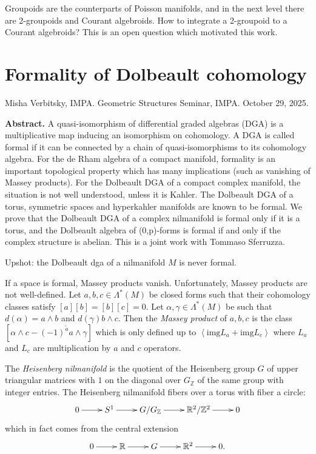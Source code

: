 Groupoids are the counterparts of Poisson
manifolds,
and in the next level there are 2-groupoids
and Courant algebroids.
How to integrate a 2-groupoid to a Courant
algebroids?
This is an open question which motivated this
work.



\section{Formality of Dolbeault cohomology}
\label{section-forma-dolbe-cohom}

\noindent
Misha Verbitsky, IMPA.
Geometric Structures Seminar, IMPA.
October 29, 2025.

\medskip\noindent
{\bf Abstract.}
A quasi-isomorphism of differential graded
algebras (DGA) is a multiplicative
map inducing an isomorphism on cohomology. A
DGA is called  formal if it can be
connected by a chain of  quasi-isomorphisms
to its cohomology algebra. For the
de Rham algebra of a compact manifold,
formality is an important  topological
property which has many implications (such as
vanishing of Massey products). For
the Dolbeault DGA of a compact complex
manifold, the situation is not well
understood, unless it is Kahler. The
Dolbeault DGA of a torus, symmetric spaces
and hyperkahler manifolds are known to be
formal.  We prove that the Dolbeault
DGA of a complex nilmanifold is formal only
if it is a torus, and the Dolbeault
algebra of (0,p)-forms is formal if and only
if the complex structure is
abelian. This is a joint work with Tommaso
Sferruzza.

\medskip\noindent
Upshot: the Dolbeault dga of a nilmanifold
$M$ is never formal.

\medskip\noindent
If a space is formal, Massey products vanish.
Unfortunately, Massey products are not
well-defined.
Let $a,b,c \in \Lambda^*(M)$ be closed forms
such that their cohomology classes satisfy
$[a][b]=[b][c]=0$.
Let  $\alpha,\gamma \in \Lambda^*(M)$
be such that $d(\alpha)=a \wedge b$ and
$d(\gamma)b \wedge c$.
Then the {\it Massey product} of $a,b,c$
is the class  $[\alpha \wedge
c-(-1)^{\tilde{a}}a \wedge \gamma]$
which is only defined up to
 $\left\langle{}\text{img}L_a + \text{img}
 L_c\right\rangle{}$
where $L_a$ and $L_c$ are multiplication by
$a$ and $c$ operators.

The {\it Heisenberg nilmanifold} is the
quotient of
the Heisenberg group $G$ of upper triangular
matrices
with $1$ on the diagonal over
$G_{\mathbb{Z}}$
of the same group with integer entries.
The Heisenberg nilmanifold fibers over a
torus
with fiber a circle:
$$
\xymatrix{
0\ar[r]&S^1\ar[r]&G/G_{\mathbb{Z}}\ar[r]&
\mathbb{R}^2/\mathbb{Z}^2\ar[r]&0
}
$$
which in fact comes from the central
extension
$$
\xymatrix{
0\ar[r]&\mathbb{R}\ar[r]&G\ar[r]&\mathbb{R}
^2\ar[r]&0.
}
$$


